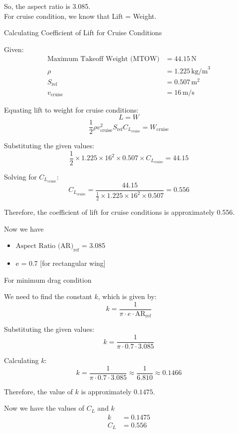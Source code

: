\documentclass[12 pt]{article}
\begin{document}
So, the aspect ratio is 3.085.\\
For cruise condition, we know that Lift = Weight.

{Calculating Coefficient of Lift for Cruise Conditions}


Given:
\begin{align*}
    \text{Maximum Takeoff Weight (MTOW)} & = 44.15 \, \text{N} \\
    \rho & = 1.225 \, \text{kg/m}^3 \\
    S_{\text{ref}} & = 0.507 \, \text{m}^2 \\
    v_{\text{cruise}} & = 16 \, \text{m/s}
\end{align*}

Equating lift to weight for cruise conditions:
\[
L = W
\]
\[
\frac{1}{2} \rho v_{\text{cruise}}^2 S_{\text{ref}} C_{L_{\text{cruise}}} = W_{\text{cruise}}
\]

Substituting the given values:
\[
\frac{1}{2} \times 1.225 \times 16^2 \times 0.507 \times C_{L_{\text{cruise}}} = 44.15
\]

Solving for $C_{L_{\text{cruise}}}$:
\[
C_{L_{\text{cruise}}} = \frac{44.15}{\frac{1}{2} \times 1.225 \times 16^2 \times 0.507} = 0.556
\]

Therefore, the coefficient of lift for cruise conditions is approximately 0.556.

Now we have
\begin{itemize}
    \item${\text{Aspect Ratio (AR)}}_{\text{ref}}$ = 3.085
    \item e = 0.7 [for rectangular wing]
\end{itemize} 

For minimum drag condition


We need to find the constant \( k \), which is given by:
\[
k = \frac{1}{\pi \cdot e \cdot \text{AR}_{\text{ref}}}
\]

Substituting the given values:
\[
k = \frac{1}{{\pi \cdot 0.7 \cdot 3.085}}
\]

Calculating \( k \):
\[
k = \frac{1}{\pi \cdot 0.7 \cdot 3.085} \approx \frac{1}{\text{6.810}} \approx 0.1466
\]

Therefore, the value of \( k \) is approximately \(0.1475\).

Now we have the values of $C_L$ and $k$
\begin{align*}
    k & = 0.1475 \\
    C_L & = 0.556
\end{align*}
\end{document}
